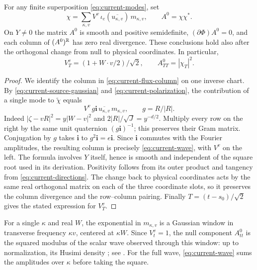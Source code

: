 \begin{proposition}\label{prop:current}
For any finite superposition \eqref{eq:current-modes}, set
\begin{equation}\label{eq:current-wave}
 \chi=\sum_{\kappa,v} V^v\,\iota_e(\overline{u_{\kappa,v}})
                  \,m_{\kappa,v},\qquad A^0=\chi\chi^* .
\end{equation}
On $Y\ne0$ the matrix $A^0$ is smooth and positive semidefinite,
$(\partial\Phi)A^0=0$, and each column of $(A^0)^{\mathbb R}$ has zero
real divergence. These conclusions hold also after the orthogonal
change from null to physical coordinates. In particular,
\[
 V_T^v=(1+W\cdot v/2)/\sqrt2,\qquad A^0_{TT}=|\chi_T|^2 .
\]
\end{proposition}

\begin{proof}
We identify the column in \eqref{eq:current-flux-column} on one
inverse chart. By \eqref{eq:current-source-gaussian} and
\eqref{eq:current-polarization}, the contribution of a single mode
to $\widetilde\chi$ equals
\[
 V^v\,g\mathbf i\,\overline{u_{\kappa,v}}\,m_{\kappa,v},
 \qquad g=R/|R| .
\]
Indeed $|\zeta-vR|^2=y|W-v|^2$ and
$2|R|/\sqrt J=y^{-d/2}$. Multiply every row on the right by the
same unit quaternion $(g\mathbf i)^{-1}$; this preserves their Gram
matrix. Conjugation by $g$ takes $\mathbf i$ to $g^2\mathbf i=e\mathbf i$.
Since $\mathbf i$ commutes with the Fourier amplitudes, the resulting
column is precisely \eqref{eq:current-wave}, with $V^v$ on the left.
The formula involves $Y$ itself, hence is smooth and independent of
the square root used in its derivation. Positivity follows from its
outer product and tangency from \eqref{eq:current-directions}. The
change back to physical coordinates acts by the same real orthogonal
matrix on each of the three coordinate slots, so it preserves the
column divergence and the row--column pairing. Finally $T=(t-s_0)/\sqrt2$
gives the stated expression for $V_T^v$.
\end{proof}

For a single $\kappa$ and real $W$, the exponential in $m_{\kappa,v}$
is a Gaussian window in transverse frequency $\kappa v$, centered at
$\kappa W$. Since $V_t^v=1$, the null component $A^0_{tt}$ is the
squared modulus of the scalar wave observed through this window:
up to normalization, its Husimi density \cite{Husimi1940}; see
\cite[Section~2.3]{KellerLasserOhsawa2016}. For the full wave,
\eqref{eq:current-wave} sums the amplitudes over $\kappa$ before
taking the square.

